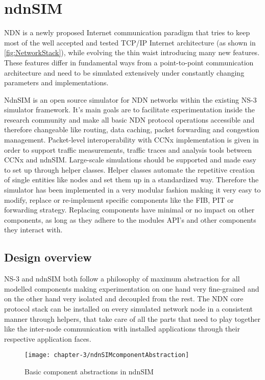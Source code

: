 \chapter{ndnSIM}

NDN is a newly proposed Internet communication paradigm that tries to keep most of the well accepted and tested TCP/IP Internet architecture (as shown in \ref{fig:NetworkStack}), while evolving the thin waist introducing many new features. These features differ in fundamental ways from a point-to-point communication architecture and need to be simulated extensively under constantly changing parameters and implementations.

NdnSIM is an open source simulator for NDN networks within the existing NS-3 simulator framework. It's main goals are to facilitate experimentation inside the research community and make all basic NDN protocol operations accessible and therefore changeable like routing, data caching, packet forwarding and congestion management. Packet-level interoperability with CCNx implementation is given in order to support traffic measurements, traffic traces and analysis tools between CCNx and ndnSIM. Large-scale simulations should be supported and made easy to set up through helper classes. Helper classes automate the repetitive creation of single entities like nodes and set them up in a standardized way. Therefore the simulator has been implemented in a very modular fashion making it very easy to modify, replace or re-implement specific components like the FIB, PIT or forwarding strategy. Replacing components have minimal or no impact on other components, as long as they adhere to the modules API's and other components they interact with.

\section{Design overview}

NS-3 and ndnSIM both follow a philosophy of maximum abstraction for all modelled components making experimentation on one hand very fine-grained and on the other hand very isolated and decoupled from the rest. The NDN core protocol stack can be installed on every simulated network node in a consistent manner through helpers, that take care of all the parts that need to play together like the inter-node communication with installed applications through their respective application faces.

\begin{figure}[H]
  \centering
  \texttt{[image: chapter-3/ndnSIMcomponentAbstraction]}
  \caption{Basic component abstractions in ndnSIM}
  \label{fig:ndnSIMcomponentAbstraction}
\end{figure}

